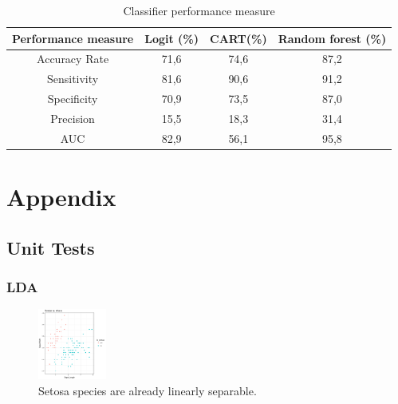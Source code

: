 \documentclass{article}
\begin{document}
\begin{center}
\begin{table}
\centering
\caption{Classifier performance measure}
\begin{tabular}{cccc}
\hline\hline
Performance measure  &                Logit (\%)   &                  CART(\%)   &     Random forest (\%) \\
\hline
Accuracy Rate        &                 71,6        &                 74,6        &       87,2             \\
Sensitivity          &                 81,6        &                 90,6        &       91,2             \\
Specificity          &                 70,9        &                 73,5        &       87,0             \\
Precision            &                 15,5        &                 18,3        &       31,4             \\
AUC                  &                 82,9        &                 56,1        &       95,8             \\
\hline\hline
\end{tabular}
\end{table}
\end{center}
\newpage
\section{Appendix}

\subsection{Unit Tests}
\subsubsection{LDA}
\begin{figure}
\label{iris}
\includegraphics[width=0.2\textwidth, trim={10mm 20mm 30mm 30mm}]{../LDA/iris.png}
\vspace{2mm}
\footnotesize\caption{Setosa species are already linearly separable.}
\end{figure}
\end{document}
